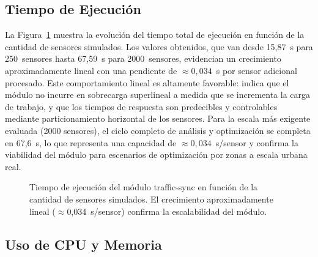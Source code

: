 \subsection{Tiempo de Ejecución}
\label{subsec:sync_tiempo}

La Figura~\ref{fig:sync_tiempo} muestra la evolución del tiempo total de ejecución en función
de la cantidad de sensores simulados. Los valores obtenidos, que van desde 15,87~s para
250~sensores hasta 67,59~s para 2000~sensores, evidencian un crecimiento aproximadamente
lineal con una pendiente de $\approx 0{,}034$~s por sensor adicional procesado.
Este comportamiento lineal es altamente favorable: indica que el módulo no incurre en
sobrecarga superlineal a medida que se incrementa la carga de trabajo, y que los tiempos
de respuesta son predecibles y controlables mediante particionamiento horizontal de los
sensores. Para la escala más exigente evaluada (2000 sensores), el ciclo completo de
análisis y optimización se completa en 67,6~s, lo que representa una capacidad de
$\approx 0{,}034$~s/sensor y confirma la viabilidad del módulo para escenarios de
optimización por zonas a escala urbana real.

\begin{figure}[htbp]
\centering
{}
\caption{Tiempo de ejecución del módulo traffic-sync en función de la cantidad de
sensores simulados. El crecimiento aproximadamente lineal ($\approx$0,034~s/sensor) confirma
la escalabilidad del módulo.}
\label{fig:sync_tiempo}
\end{figure}

\subsection{Uso de CPU y Memoria}
\label{subsec:sync_recursos}

